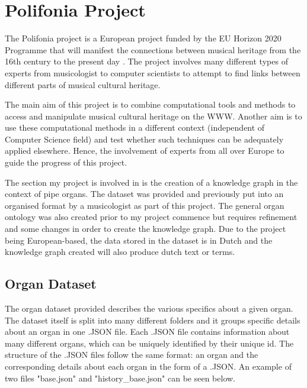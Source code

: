 \section{Polifonia Project}
\hspace{0.5cm} The Polifonia project is a European project funded by the EU Horizon 2020 Programme that will manifest the connections between musical heritage from the 16th century to the present day \cite{polifonia}. The project involves many different types of experts from musicologist to computer scientists to attempt to find links between different parts of musical cultural heritage. 

The main aim of this project is to combine computational tools and methods to access and manipulate musical cultural heritage on the WWW. Another aim is to use these computational methods in a different context (independent of Computer Science field) and test whether such techniques can be adequately applied elsewhere. Hence, the involvement of experts from all over Europe to guide the progress of this project. \cite{polifoniaproject}

The section my project is involved in is the creation of a knowledge graph in the context of pipe organs. The dataset was provided and previously put into an organised format by a musicologist as part of this project. The general organ ontology was also created prior to my project commence but requires refinement and some changes in order to create the knowledge graph. Due to the project being European-based, the data stored in the dataset is in Dutch and the knowledge graph created will also produce dutch text or terms.  

\subsection{Organ Dataset}
\hspace{0.5cm} The organ dataset provided describes the various specifics about a given organ. The dataset itself is split into many different folders and it groups specific details about an organ in one .JSON file. Each .JSON file contains information about many different organs, which can be uniquely identified by their unique id. The structure of the .JSON files follow the same format: an organ and the corresponding details about each organ in the form of a .JSON. An example of two files "base.json" and "history\_base.json" can be seen below. 

